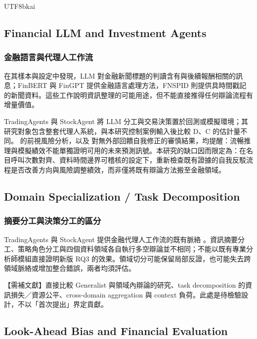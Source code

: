 \documentclass[12pt,a4paper]{article}
\newcommand{\grp}[1]{\textsf{#1}}
\begin{document}
\begin{CJK}{UTF8}{bkai}
\subsection{Financial LLM and Investment Agents}

\subsubsection{金融語言與代理人工作流}
\citet{lopezlira2023chatgpt} 在其樣本與設定中發現，LLM 對金融新聞標題的判讀含有與後續報酬相關的訊息；FinBERT \citep{araci2019finbert} 與 FinGPT \citep{liu2023fingpt} 提供金融語言處理方法，FNSPID \citep{dong2024fnspid} 則提供具時間戳記的新聞資料。這些工作說明資訊整理的可能用途，但不能直接推得任何辯論流程有增量價值。

TradingAgents \citep{xiao2024tradingagents} 與 StockAgent \citep{zhang2024stockagent} 將 LLM 分工與交易決策置於回測或模擬環境；其研究對象包含整套代理人系統，與本研究控制案例輸入後比較 \grp{D}、\grp{C} 的估計量不同。\citet{glasserman2023lookahead} 的前視風險分析，以及 \citet{huang2024selfcorrect} 對無外部回饋自我修正的審慎結果，均提醒：流暢推理與模擬績效不能單獨證明可用的未來預測訊號。本研究的缺口因而限定為：在名目呼叫次數對齊、資料時間邊界可稽核的設定下，重新檢查既有證據的自我反駁流程是否改善方向與風險調整績效，而非僅將既有辯論方法搬至金融領域。
\subsection{Domain Specialization / Task Decomposition}

\subsubsection{摘要分工與決策分工的區分}

TradingAgents 與 StockAgent 提供金融代理人工作流的既有脈絡 \citep{xiao2024tradingagents,zhang2024stockagent}。資訊摘要分工、策略角色分工與四個資料領域各自執行多空辯論並不相同；不能以既有專業分析師模組直接證明新版 RQ3 的效果。領域切分可能保留局部反證，也可能失去跨領域脈絡或增加整合錯誤，兩者均須評估。

【需補文獻】直接比較 Generalist 與領域內辯論的研究、task decomposition 的資訊損失／資源公平、cross-domain aggregation 與 context 負荷。此處是待檢驗設計，不以「首次提出」界定貢獻。

\subsection{Look-Ahead Bias and Financial Evaluation}


\end{CJK}
\end{document}
